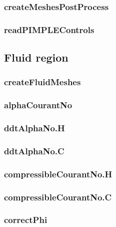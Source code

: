 \subsubsection*{createMeshesPostProcess}

\subsubsection*{readPIMPLEControls}

\subsection{Fluid region}
\subsubsection*{createFluidMeshes}

\subsubsection*{alphaCourantNo}

\subsubsection*{ddtAlphaNo.H}

\subsubsection*{ddtAlphaNo.C}

\subsubsection*{compressibleCourantNo.H}

\subsubsection*{compressibleCourantNo.C}

\subsubsection*{correctPhi}

